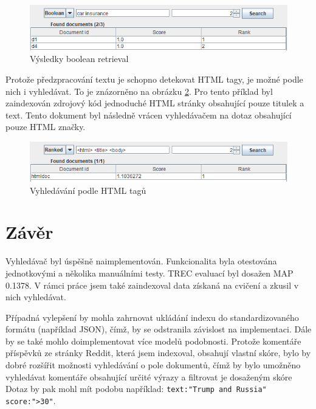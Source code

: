 \documentclass[11pt,a4paper]{scrartcl}
\begin{document}
	\begin{figure}[h]
		\centering
		\includegraphics[width=\linewidth]{gui-boolean-res}
		\caption{Výsledky boolean retrieval}
		\label{fig:boolean}
	\end{figure}
	
	Protože předzpracování textu je schopno detekovat HTML tagy, je možné podle nich i vyhledávat. To je znázorněno na obrázku \ref{fig:html-search}. Pro tento příklad byl zaindexován zdrojový kód jednoduché HTML stránky obsahující pouze titulek a text. Tento dokument byl následně vrácen vyhledávačem na dotaz obsahující pouze HTML značky.
	
	\begin{figure}[h]
		\centering
		\includegraphics[width=\linewidth]{gui-html-search}
		\caption{Vyhledávání podle HTML tagů}
		\label{fig:html-search}
	\end{figure}
	
	\section{Závěr}
	
	Vyhledávač byl úspěšně naimplementován. Funkcionalita byla otestována jednotkovými a několika manuálními testy. TREC evaluací byl dosažen MAP 0.1378. V rámci práce jsem také zaindexoval data získaná na cvičení a zkusil v nich vyhledávat.
	
	Případná vylepšení by mohla zahrnovat ukládání indexu do standardizovaného formátu (například JSON), čímž, by se odstranila závislost na implementaci. Dále by se také mohlo doimplementovat více modelů podobnosti. Protože komentáře příspěvků ze stránky Reddit, která jsem indexoval, obsahují vlastní skóre, bylo by dobré rozšířit možnosti vyhledávání o pole dokumentů, čímž by bylo umožněno vyhledávat komentáře obsahující určité výrazy a filtrovat je dosaženým skóre Dotaz by pak mohl mít podobu například: \verb|text:"Trump and Russia" score:">30"|.
	
\end{document}

